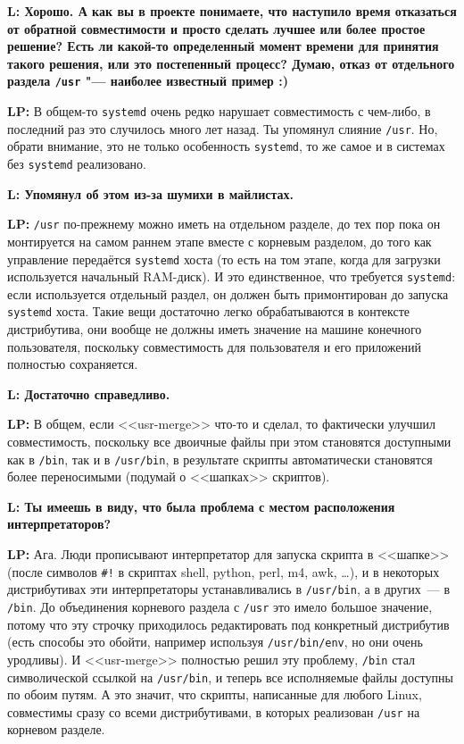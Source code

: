 \documentclass[10pt, a5paper]{article}
\begin{document}
\begin{Parallel}[p]{}{}
{{\noindent \bf L: Хорошо. А как вы в проекте понимаете, что наступило время отказаться от обратной совместимости и просто сделать лучшее или более простое решение? Есть ли какой-то определенный момент времени для принятия такого решения, или это постепенный процесс? Думаю, отказ от отдельного раздела \verb!/usr!  "--- наиболее известный пример :)}

{\noindent \bf LP:} В общем-то \verb!systemd! очень редко нарушает совместимость с чем-либо,  в последний раз это случилось много лет назад. Ты упомянул слияние \verb!/usr!. Но, обрати внимание, это не только особенность \verb!systemd!, то же самое и в системах без \verb!systemd! реализовано.

{\noindent \bf L: Упомянул об этом из-за шумихи в майлистах.}

{\noindent \bf LP:} \verb!/usr! по-прежнему можно иметь на отдельном разделе, до тех пор пока он монтируется на самом раннем этапе вместе с корневым разделом, до того как управление передаётся \verb!systemd! хоста (то есть на том этапе, когда для загрузки используется начальный RAM-диск). И это единственное, что требуется \verb!systemd!: если используется отдельный раздел, он должен быть примонтирован до запуска \verb!systemd! хоста. Такие вещи достаточно легко обрабатываются в контексте дистрибутива, они вообще не должны иметь значение на машине конечного пользователя, поскольку совместимость для пользователя и его приложений полностью сохраняется.

{\noindent \bf L: Достаточно справедливо.}

{\noindent \bf LP:} В общем, если <<usr-merge>> что-то и сделал, то фактически улучшил совместимость, поскольку все двоичные файлы при этом становятся доступными как в \verb!/bin!, так и в \verb!/usr/bin!, в результате скрипты автоматически становятся более переносимыми (подумай о <<шапках>> скриптов).

{\noindent \bf L: Ты имеешь в виду, что была проблема с местом расположения интерпретаторов?}

{\noindent \bf LP:} Ага. Люди прописывают интерпретатор для запуска скрипта в <<шапке>> (после символов \verb"#!" в скриптах shell, python, perl, m4, awk, \ldots), и в некоторых дистрибутивах эти интерпретаторы устанавливались в \verb!/usr/bin!, а в других~--- в \verb!/bin!. До объединения корневого раздела с \verb!/usr! это имело большое значение, потому что эту строчку приходилось редактировать под конкретный дистрибутив (есть способы это обойти, например используя \verb!/usr/bin/env!, но они очень уродливы). И <<usr-merge>> полностью решил эту проблему, \verb!/bin! стал символической ссылкой на \verb!/usr/bin!, и теперь все исполняемые файлы доступны по обоим путям. А это значит, что скрипты, написанные для любого Linux, совместимы сразу со всеми дистрибутивами, в которых реализован \verb!/usr! на корневом разделе.

}
\end{Parallel}
\end{document}
